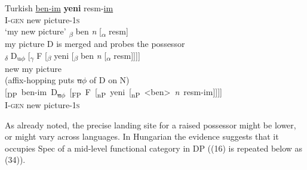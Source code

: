 \documentclass[output=paper
,modfonts
,nonflat]{langsci/langscibook}
\begin{document}
\begin{exe} \settowidth{}
	\ex Turkish
	\xlist
	\ex 
	\gll\underline{ben}\underline{-im}   \textbf{yeni}  resm-\underline{im} \\
	I-\textsc{gen}  new   picture-1\textsc{s}\\
	\glt `my new picture'  	
	\ex {\lbrack}\textsubscript{$\beta$} ben \textit{n} [\textsubscript{$\alpha$} resm]{\rbrack}\\
	\hspace{0.5cm}my	\hspace{0.8cm}picture
	\ex D is merged and probes the possessor\\
	{\lbrack}\textsubscript{$\delta$} D\textsubscript{u}\textsubscript{$\phi$} [\textsubscript{$\gamma$} F [\textsubscript{$\beta$} yeni [\textsubscript{${\beta}$} ben \textit{n} [\textsubscript{$\alpha$} resm]]]]{\rbrack}\\
	\hspace{2.3cm}new  \hspace{.4cm}my \hspace{.8cm}picture\\
	\ex (affix-hopping puts \sout{u$\phi$} of D on N)\\
	\mbox{[\textsubscript{DP} ben-im D\textsubscript{\sout{u$\phi$}} [\textsubscript{FP} F [\textsubscript{nP} yeni [\textsubscript{nP} <ben> \textit{n} resm-im]]]]}\\ 
	\hspace{.59cm}I-\textsc{gen} \hspace{2.38cm}new  \hspace{1.95cm}picture-1\textsc{s}\\
	\endxlist
\end{exe}
As already noted, the precise landing site for a raised possessor might be lower, or might vary across languages. In Hungarian the evidence suggests that it occupies Spec of a mid-level functional category in DP ((16) is repeated below as (34)). 
\end{document}
